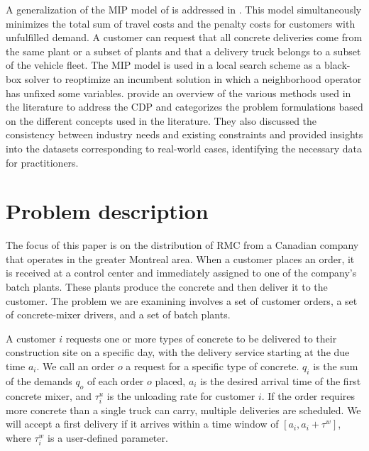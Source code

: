 A generalization of the MIP model of \cite{kinable2014concrete} is addressed in \cite{asbach2009analysis}. This model simultaneously minimizes the total sum of travel costs and the penalty costs for customers with unfulfilled demand. A customer can request that all concrete deliveries come from the same plant or a subset of plants and that a delivery truck belongs to a subset of the vehicle fleet. The MIP model is used in a local search scheme as a black-box solver to reoptimize an incumbent solution in which a neighborhood operator has unfixed some variables. \cite{tzanetos2023systematic} provide an overview of the various methods used in the literature to address the CDP and categorizes the problem formulations based on the different concepts used in the literature. They also discussed the consistency between industry needs and existing constraints and provided insights into the datasets corresponding to real-world cases, identifying the necessary data for practitioners.

\section{Problem description}
\label{sec:cdp_desc_form}
The focus of this paper is on the distribution of RMC from a Canadian company that operates in the greater Montreal area. When a customer places an order, it is received at a control center and immediately assigned to one of the company's batch plants. These plants produce the concrete and then deliver it to the customer. The problem we are examining involves a set of customer orders, a set of concrete-mixer drivers, and a set of batch plants.

A customer $i$ requests one or more types of concrete to be delivered to their construction site on a specific day, with the delivery service starting at the due time $a_i$.  We call an order $o$ a request for a specific type of concrete. $q_i$ is the sum of the demands $q_o$ of each order $o$ placed, $a_i$ is the desired arrival time of the first concrete mixer, and $\tau^u_i$ is the unloading rate for customer $i$. If the order requires more concrete than a single truck can carry, multiple deliveries are scheduled. We will accept a first delivery if it arrives within a time window of $\left[a_i, a_i + \tau^w \right]$, where $\tau^w_i$ is a user-defined parameter.

